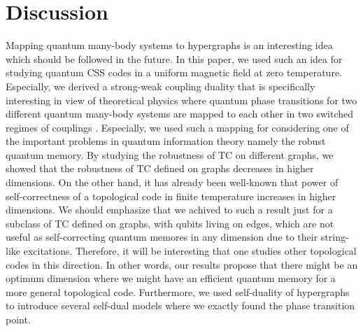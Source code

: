 \documentclass[preprintnumbers, showpacs, floatfix,twocolumn,
preprintnumbers, superscriptaddress]{revtex4}
\begin{document}
\section{Discussion}
Mapping quantum many-body systems to hypergraphs is an
interesting idea which should be followed in the future. In this
paper, we used such an idea for studying quantum CSS codes in a
uniform magnetic field at zero temperature. Especially, we derived
a strong-weak coupling duality that is specifically interesting in
view of theoretical physics where quantum phase transitions for
two different quantum many-body systems are mapped to each other
in two switched regimes of couplings . Especially, we used such a
mapping for considering one of the important problems in quantum
information theory namely the robust quantum memory. By studying
the robustness of TC on different graphs, we showed that the
robustness of TC defined on graphs decreases in higher dimensions. On the other
hand, it has already been well-known that power of
self-correctness of a topological code in finite temperature
increases in higher dimensions. We should emphasize that we achived to
such a result just for a subclass of TC defined on graphs, with qubits living on edges, which are not useful as self-correcting quantum memores in any dimension due to their string-like excitations. Therefore,  it will be interesting that one
studies other topological codes in this direction. In other words, our results propose
that there might be an optimum dimension where we might have an
efficient quantum memory for a more general topological code. Furthermore, we
used self-duality of hypergraphs to introduce several self-dual
models where we exactly found the phase transition point.
\end{document}
